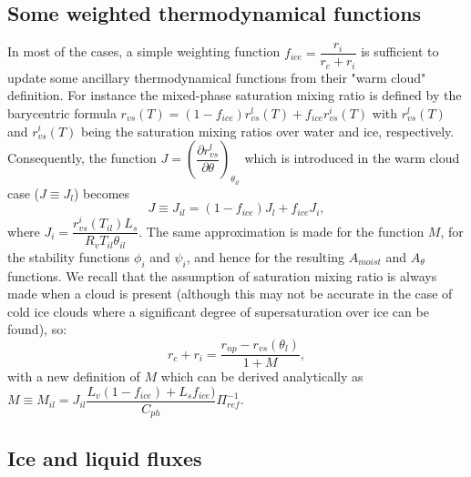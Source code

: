 \subsection{Some weighted thermodynamical functions}

In most of the cases, a simple weighting function 
$f_{ice}=\dfrac {r_i}{r_c+r_i}$ is sufficient to update some ancillary 
thermodynamical functions from their "warm cloud" definition. For instance the 
mixed-phase saturation mixing ratio is defined by the barycentric formula
$r_{vs}({T})=(1-f_{ice})r^l_{vs}({T}) +f_{ice} r^i_{vs}({T})$
with ${r^l_{vs}}(T)$ and ${r^i_{vs}}(T)$ being the saturation mixing ratios over
water and ice, respectively. Consequently, the function 
$J=\left( \dfrac {\partial  r^l_{vs}} {\partial \theta} \right)_{\theta_{il}}$
which is introduced in the warm cloud case ($J \equiv J_l$) becomes
\begin{equation} \label{newdefJ}
J \equiv J_{il}=(1-f_{ice}) J_l + f_{ice} J_i,
\end{equation}
where $J_i=\dfrac {r^i_{vs}(T_{il}) L_s} {R_v T_{il} \theta_{il}} $. 
The same approximation is made for the function $M$, for the 
stability functions $\phi_i$ and $\psi_i$, and hence for the resulting
$A_{moist}$ and $A_{\theta}$ functions. We recall that the assumption of 
saturation mixing ratio is always made when a cloud is present (although this 
may not be accurate in the case of cold ice clouds where a significant degree
of supersaturation over ice can be found), so:
\begin{equation}
r_c + r_i = \dfrac {r_{np}-r_{vs}(\theta_l)} {1+M},
\end{equation}
with a new definition of $M$ which can be derived analytically as
$ M \equiv M_{il} = J_{il} \dfrac{L_v (1-f_{ice})+L_s f_{ice})}{C_{ph}}\Pi_{ref}^{-1} $. \\


\subsection{Ice and liquid fluxes}


